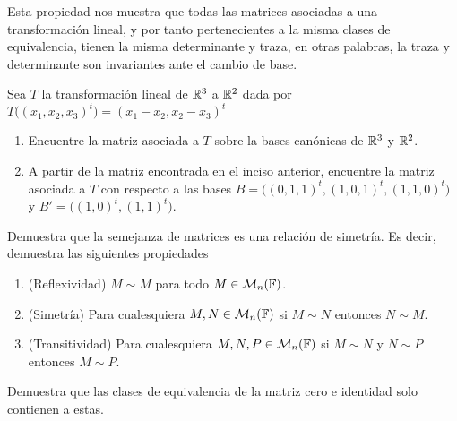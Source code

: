 Esta propiedad nos muestra que todas las matrices asociadas a una transformación lineal, y por tanto pertenecientes a la misma clases de equivalencia, tienen la misma determinante y traza, en otras palabras, la traza y determinante son invariantes ante el cambio de base.


\ExerciseSection

\begin{exerciselist}
  \item Sea $T$ la transformación lineal de $\mathbb{R}^3$ a $\mathbb{R}^2$ dada por $T\bigl((x_1, x_2, x_3)^t\bigr) = (x_1 - x_2, x_2 - x_3)^t$
    \begin{enumerate}
      \item Encuentre la matriz asociada a $T$ sobre la bases canónicas de $\mathbb{R}^3$ y $\mathbb{R}^2$.
      \item A partir de la matriz encontrada en el inciso anterior, encuentre la matriz asociada a $T$ con respecto a las bases $B = \bigl( (0, 1, 1)^t, (1, 0, 1)^t, (1, 1, 0)^t \bigr)$ y $B' = \bigl( (1, 0)^t, (1, 1)^t \bigr)$.
    \end{enumerate}

  \item Demuestra que la semejanza de matrices es una relación de simetría. Es decir, demuestra las siguientes propiedades
    \begin{enumerate}
      \item (Reflexividad) $M \sim M$ para todo $M \in \mathcal{M}_n(\mathbb{F})$.
      \item (Simetría) Para cualesquiera $M,N \in \mathcal{M}_n(\mathbb{F})$ si $M \sim N$ entonces $N \sim M$.
      \item (Transitividad) Para cualesquiera $M,N,P \in \mathcal{M}_n(\mathbb{F})$ si $M \sim N$ y $N \sim P$ entonces $M \sim P$.
    \end{enumerate}
  
  \item Demuestra que las clases de equivalencia de la matriz cero e identidad solo contienen a estas.
\end{exerciselist}